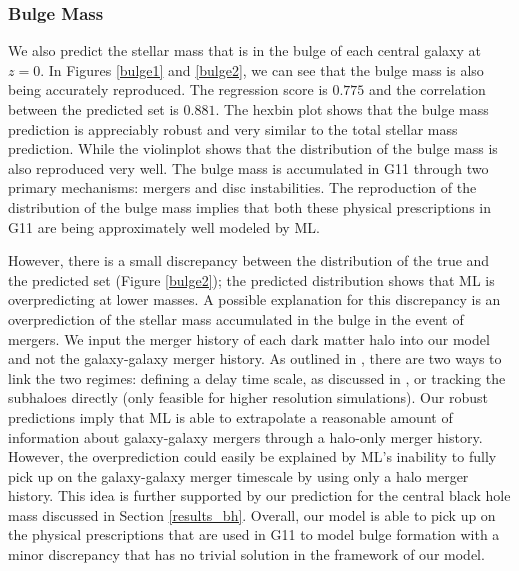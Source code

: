 \documentclass[a4paper,fleqn,usenatbib]{mnras}
\begin{document}
\subsubsection{Bulge Mass} \label{results_bulge}
\par 
We also predict the stellar mass that is in the bulge of each central galaxy at $z=0$. In Figures \ref{bulge1} and \ref{bulge2}, we can see that the bulge mass is also being accurately reproduced. The regression score is $0.775$ and the correlation between the predicted set is $0.881$. The hexbin plot shows that the bulge mass prediction is appreciably robust and very similar to the total stellar mass prediction. While the violinplot shows that the distribution of the bulge mass is also reproduced very well. The bulge mass is accumulated in G11 through two primary mechanisms: mergers and disc instabilities. The reproduction of the distribution of the bulge mass implies that both these physical prescriptions in G11 are being approximately well modeled by ML. 

\par However, there is a small discrepancy between the distribution of the true and the predicted set (Figure \ref{bulge2}); the predicted distribution shows that ML is overpredicting at lower masses. A possible explanation for this discrepancy is an overprediction of the stellar mass accumulated in the bulge in the event of mergers. We input the merger history of each dark matter halo into our model and not the galaxy-galaxy merger history. As outlined in \citet{hopkins2010mergers}, there are two ways to link the two regimes: defining a delay time scale, as discussed in \citet{boylan2008dynamical}, or tracking the subhaloes directly (only feasible for higher resolution simulations). Our robust predictions imply that ML is able to extrapolate a reasonable amount of information about galaxy-galaxy mergers through a halo-only merger history. However, the overprediction could easily be explained by ML's inability to fully pick up on the galaxy-galaxy merger timescale by using only a halo merger history. This idea is further supported by our prediction for the central black hole mass discussed in Section \ref{results_bh}. Overall, our model is able to pick up on the physical prescriptions that are used in G11 to model bulge formation with a minor discrepancy that has no trivial solution in the framework of our model. 
\end{document}

